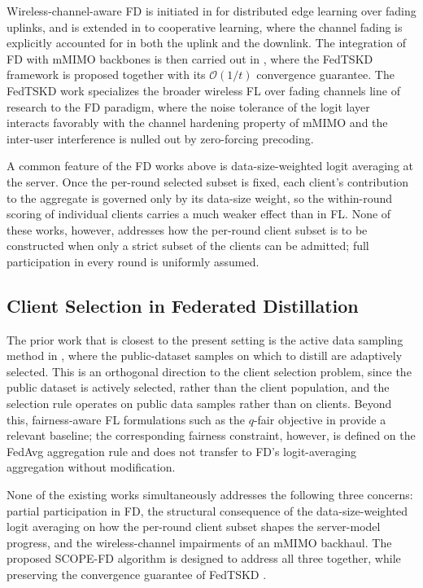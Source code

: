 \documentclass[journal]{IEEEtran}
\begin{document}
Wireless-channel-aware FD is initiated in \cite{ahn2019wireless} for distributed edge learning over fading uplinks, and is extended in \cite{ahn2020cooperative} to cooperative learning, where the channel fading is explicitly accounted for in both the uplink and the downlink. The integration of FD with mMIMO backbones is then carried out in \cite{mu2024fedtskd}, where the FedTSKD framework is proposed together with its $\mathcal{O}(1/t)$ convergence guarantee. The FedTSKD work specializes the broader wireless FL over fading channels line of research \cite{amiri2020federated, amiri2020machine, vu2020cell, amiri2021convergence} to the FD paradigm, where the noise tolerance of the logit layer interacts favorably with the channel hardening property of mMIMO and the inter-user interference is nulled out by zero-forcing precoding.

A common feature of the FD works above is data-size-weighted logit averaging at the server. Once the per-round selected subset is fixed, each client's contribution to the aggregate is governed only by its data-size weight, so the within-round scoring of individual clients carries a much weaker effect than in FL. None of these works, however, addresses how the per-round client subset is to be constructed when only a strict subset of the clients can be admitted; full participation in every round is uniformly assumed.

\subsection{Client Selection in Federated Distillation}
\label{ssec:rw-fd-selection}

The prior work that is closest to the present setting is the active data sampling method in \cite{liu2022active}, where the public-dataset samples on which to distill are adaptively selected. This is an orthogonal direction to the client selection problem, since the public dataset is actively selected, rather than the client population, and the selection rule operates on public data samples rather than on clients. Beyond this, fairness-aware FL formulations such as the $q$-fair objective in \cite{li2020qffl} provide a relevant baseline; the corresponding fairness constraint, however, is defined on the FedAvg aggregation rule and does not transfer to FD's logit-averaging aggregation without modification.

None of the existing works simultaneously addresses the following three concerns: partial participation in FD, the structural consequence of the data-size-weighted logit averaging on how the per-round client subset shapes the server-model progress, and the wireless-channel impairments of an mMIMO backhaul. The proposed SCOPE-FD algorithm is designed to address all three together, while preserving the convergence guarantee of FedTSKD \cite{mu2024fedtskd}.
\end{document}
